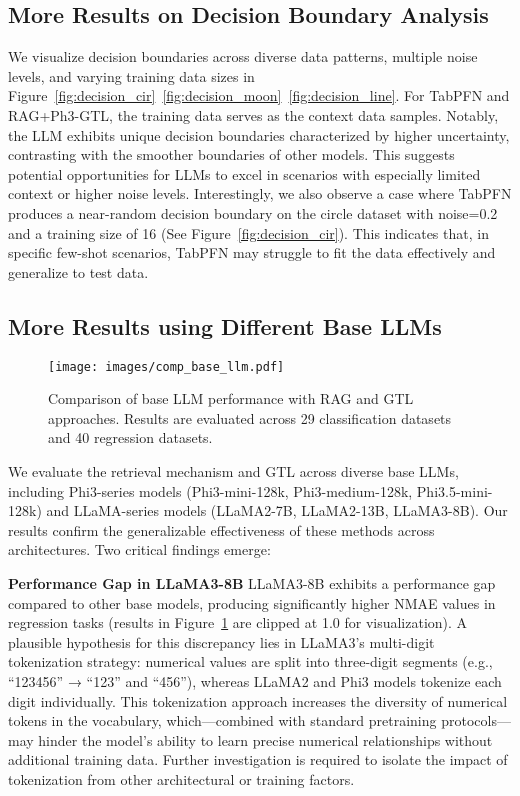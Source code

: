 \subsection{More Results on Decision Boundary Analysis}
\label{app:exp_dec_bound}
We visualize decision boundaries across diverse data patterns, multiple noise levels, and varying training data sizes in Figure~\ref{fig:decision_cir}~\ref{fig:decision_moon}~\ref{fig:decision_line}. For TabPFN and RAG+Ph3-GTL, the training data serves as the context data samples. Notably, the LLM exhibits unique decision boundaries characterized by higher uncertainty, contrasting with the smoother boundaries of other models. This suggests potential opportunities for LLMs to excel in scenarios with especially limited context or higher noise levels. Interestingly, we also observe a case where TabPFN produces a near-random decision boundary on the circle dataset with noise=0.2 and a training size of 16 (See Figure~\ref{fig:decision_cir}). This indicates that, in specific few-shot scenarios, TabPFN may struggle to fit the data effectively and generalize to test data.

\subsection{More Results using Different Base LLMs}
\label{app:exp_base_llm}

\begin{figure}[t]
    \centering
    \texttt{[image: images/comp\_base\_llm.pdf]}
    \caption{Comparison of base LLM performance with RAG and GTL approaches. Results are evaluated across 29 classification datasets and 40 regression datasets.}
    \label{fig:comp_base_llm}
\end{figure}

We evaluate the retrieval mechanism and GTL across diverse base LLMs, including Phi3-series models (Phi3-mini-128k, Phi3-medium-128k, Phi3.5-mini-128k) and LLaMA-series models (LLaMA2-7B, LLaMA2-13B, LLaMA3-8B). Our results confirm the generalizable effectiveness of these methods across architectures. Two critical findings emerge:

\textbf{Performance Gap in LLaMA3-8B} LLaMA3-8B exhibits a performance gap compared to other base models, producing significantly higher NMAE values in regression tasks (results in Figure~\ref{fig:comp_base_llm} are clipped at 1.0 for visualization). A plausible hypothesis for this discrepancy lies in LLaMA3’s multi-digit tokenization strategy: numerical values are split into three-digit segments (e.g., “123456” → “123” and “456”), whereas LLaMA2 and Phi3 models tokenize each digit individually. This tokenization approach increases the diversity of numerical tokens in the vocabulary, which—combined with standard pretraining protocols—may hinder the model’s ability to learn precise numerical relationships without additional training data. Further investigation is required to isolate the impact of tokenization from other architectural or training factors.

